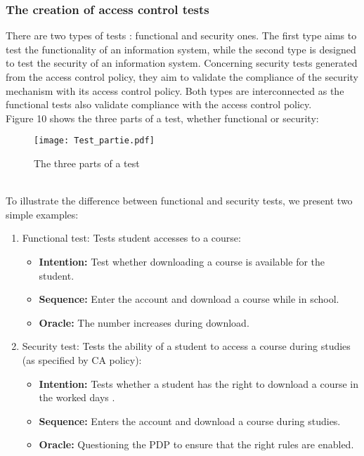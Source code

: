 \documentclass{acm_proc_article-sp}
\begin{document}
\subsubsection{The creation of access control tests}
There are two types of tests \cite{Tej}: functional and security ones. The first type aims to test the functionality of an information system, while the second type is designed to test the security of an information system. Concerning security tests generated from the access control policy, they aim to validate the compliance of the security mechanism with its access control policy. Both types are interconnected as the functional tests also validate compliance with the access control policy.\\
Figure 10 shows the three parts of a test, whether functional or security:
\begin{figure}[h!]                                                       \centering                                                               \texttt{[image: Test\_partie.pdf]}        \caption{The three parts of a test}                                      \label{The three parts of a test}                                        \end{figure}                                                             \\
To illustrate the difference between functional and security tests, we present two simple examples:
\begin{enumerate}
 \item Functional test: Tests student accesses to a course:
 \begin{itemize}
  \item \textbf{Intention:} Test whether downloading a course is available for the student.
  \item \textbf{Sequence:} Enter the account and download a course while in school.
  \item \textbf{Oracle:} The number increases during download.
 \end{itemize}
 \item Security test: Tests the ability of a student to access a course during studies (as specified by CA policy):
 \begin{itemize}
  \item \textbf{Intention:} Tests whether a student has the right to download a course in the worked days .
  \item \textbf{Sequence:} Enters the account and download a course during studies.
  \item \textbf{Oracle:} Questioning the PDP to ensure that the right rules are enabled.
 \end{itemize}
\end{enumerate}
\end{document}
